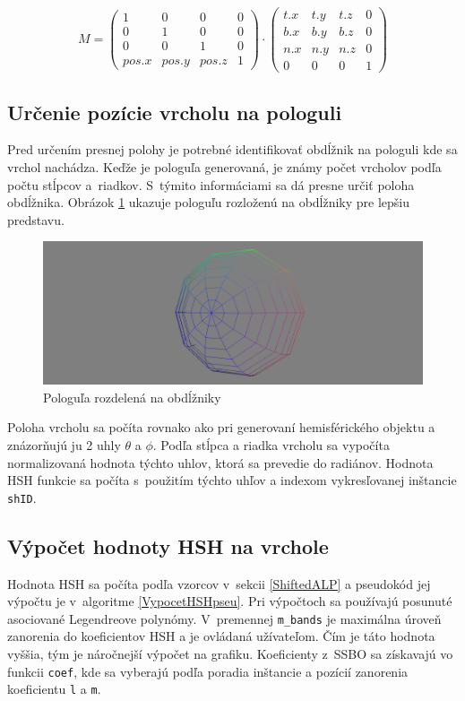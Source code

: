 \begin{equation} \label{ModelMatrixforHSH}
    M = 
    \begin{pmatrix}
    1 & 0 & 0 & 0\\
    0 & 1 & 0 & 0\\
    0 & 0 & 1 & 0\\
    pos.x & pos.y & pos.z & 1
    \end{pmatrix}
    \cdot
    \begin{pmatrix}
    t.x & t.y & t.z & 0\\
    b.x & b.y & b.z & 0\\
    n.x & n.y & n.z & 0\\
    0 & 0 & 0 & 1
    \end{pmatrix}
\end{equation}

\subsection*{Určenie pozície vrcholu na pologuli}
Pred určením presnej polohy je potrebné identifikovať obdĺžnik na pologuli kde sa vrchol nachádza. Keďže je pologuľa generovaná, je známy počet vrcholov podľa počtu stĺpcov a~riadkov. S~týmito informáciami sa dá presne určiť poloha obdĺžnika. Obrázok \ref{Polgul} ukazuje pologuľu rozloženú na obdĺžniky pre lepšiu predstavu.

\begin{figure}[t!]\label{Polgul}
    \centering
    \includegraphics[width=0.90\linewidth]{obrazky-figures/polgul.png}
    \caption{Pologuľa rozdelená na obdĺžniky}
\end{figure}

Poloha vrcholu sa počíta rovnako ako pri generovaní hemisférického objektu a znázorňujú ju 2 uhly $\theta$ a $\phi$. Podľa stĺpca a riadka vrcholu sa vypočíta normalizovaná hodnota týchto uhlov, ktorá sa prevedie do radiánov. Hodnota HSH funkcie sa počíta s~použitím týchto uhľov a indexom vykresľovanej inštancie \verb|shID|.

\subsection*{Výpočet hodnoty HSH na vrchole}
Hodnota HSH sa počíta podľa vzorcov v~sekcii \ref{ShiftedALP} a pseudokód jej výpočtu je v~algoritme \ref{VypocetHSHpseu}. Pri výpočtoch sa používajú posunuté asociované Legendreove polynómy. V~premennej \verb|m_bands| je maximálna úroveň zanorenia do koeficientov HSH a je ovládaná užívateľom. Čím je táto hodnota vyššia, tým je náročnejší výpočet na grafiku. Koeficienty z~SSBO sa získavajú vo funkcii \verb|coef|, kde sa vyberajú podľa poradia inštancie a pozícií zanorenia koeficientu \verb|l| a \verb|m|.

